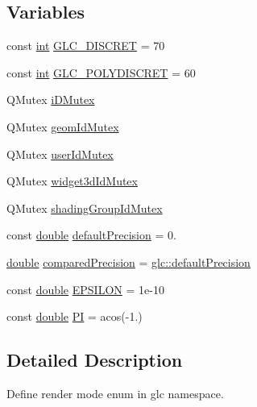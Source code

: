 \subsection*{Variables}
\begin{DoxyCompactItemize}
\item 
const \hyperlink{ioapi_8h_a787fa3cf048117ba7123753c1e74fcd6}{int} \hyperlink{namespaceglc_acefef2777b4762200bba27e60924ed43}{G\-L\-C\-\_\-\-D\-I\-S\-C\-R\-E\-T} = 70
\item 
const \hyperlink{ioapi_8h_a787fa3cf048117ba7123753c1e74fcd6}{int} \hyperlink{namespaceglc_a5ada6dbdc4f76b79195f64214ca91be5}{G\-L\-C\-\_\-\-P\-O\-L\-Y\-D\-I\-S\-C\-R\-E\-T} = 60
\item 
Q\-Mutex \hyperlink{namespaceglc_aea03de24834fa317d9f59314c51ecad5}{i\-D\-Mutex}
\item 
Q\-Mutex \hyperlink{namespaceglc_a9176591e1e73cf86595e70df3265faa0}{geom\-Id\-Mutex}
\item 
Q\-Mutex \hyperlink{namespaceglc_a64f61b5cd4c7600d481f8c4960c9cc4f}{user\-Id\-Mutex}
\item 
Q\-Mutex \hyperlink{namespaceglc_afd490963dc902de4f7bccd5e2a473f12}{widget3d\-Id\-Mutex}
\item 
Q\-Mutex \hyperlink{namespaceglc_a84965f37a5e138508dcae5ab60c7b570}{shading\-Group\-Id\-Mutex}
\item 
const \hyperlink{_super_l_u_support_8h_a8956b2b9f49bf918deed98379d159ca7}{double} \hyperlink{namespaceglc_a0b8f3bbe0682af341eecdb07b91b6c01}{default\-Precision} = 0.
\item 
\hyperlink{_super_l_u_support_8h_a8956b2b9f49bf918deed98379d159ca7}{double} \hyperlink{namespaceglc_ae146899b11b8acc404897dae6184c487}{compared\-Precision} = \hyperlink{namespaceglc_a0b8f3bbe0682af341eecdb07b91b6c01}{glc\-::default\-Precision}
\item 
const \hyperlink{_super_l_u_support_8h_a8956b2b9f49bf918deed98379d159ca7}{double} \hyperlink{namespaceglc_aae6f7586977fa188ed9f7bfd019ee5fc}{E\-P\-S\-I\-L\-O\-N} = 1e-\/10
\item 
const \hyperlink{_super_l_u_support_8h_a8956b2b9f49bf918deed98379d159ca7}{double} \hyperlink{namespaceglc_ad0f268df7555a0084f6f242e599a0572}{P\-I} = acos(-\/1.)
\end{DoxyCompactItemize}


\subsection{Detailed Description}
Define render mode enum in glc namespace. 

